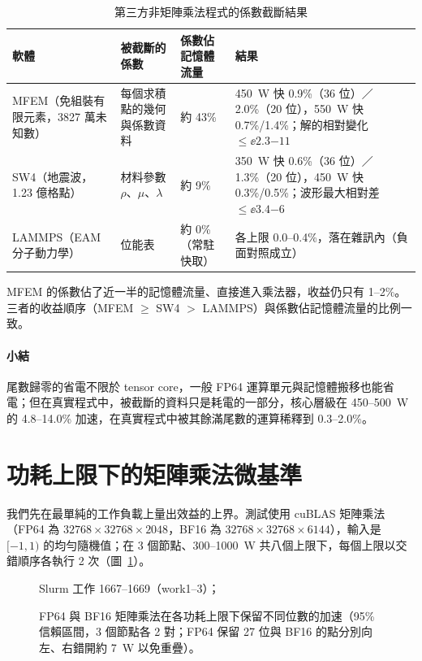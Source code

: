 \begin{table}[tbp]
\centering
\caption{第三方非矩陣乘法程式的係數截斷結果}\label{tab:apps}
\small
\begin{tabularx}{\textwidth}{@{}>{\raggedright\arraybackslash}p{3.0cm}>{\raggedright\arraybackslash}p{2.6cm}>{\centering\arraybackslash}p{1.9cm}L@{}}
\toprule
軟體 & 被截斷的係數 & 係數佔\newline 記憶體流量 & 結果 \\
\midrule
MFEM（免組裝有限元素，3827 萬未知數） & 每個求積點的幾何與係數資料 & 約 43\% & 450~W 快 0.9\%（36 位）／2.0\%（20 位），550~W 快 0.7\%/1.4\%；解的相對變化 $\le \ee{2.3}{-11}$ \\
SW4（地震波，1.23 億格點） & 材料參數 $\rho$、$\mu$、$\lambda$ & 約 9\% & 350~W 快 0.6\%（36 位）／1.3\%（20 位），450~W 快 0.3\%/0.5\%；波形最大相對差 $\le \ee{3.4}{-6}$ \\
LAMMPS（EAM 分子動力學） & 位能表 & 約 0\%（常駐快取） & 各上限 0.0–0.4\%，落在雜訊內（負面對照成立） \\
\bottomrule
\end{tabularx}
\end{table}

MFEM 的係數佔了近一半的記憶體流量、直接進入乘法器，收益仍只有 1–2\%。三者的收益順序（MFEM $\ge$ SW4 $>$ LAMMPS）與係數佔記憶體流量的比例一致。

\paragraph{小結}尾數歸零的省電不限於 tensor core，一般 FP64 運算單元與記憶體搬移也能省電；但在真實程式中，被截斷的資料只是耗電的一部分，核心層級在 450–500~W 的 4.8–14.0\% 加速，在真實程式中被其餘滿尾數的運算稀釋到 0.3–2.0\%。

\section{功耗上限下的矩陣乘法微基準}\label{sec:gemm}

我們先在最單純的工作負載上量出效益的上界。測試使用 cuBLAS 矩陣乘法（FP64 為 $32768\times32768\times2048$，BF16 為 $32768\times32768\times6144$），輸入是 $[-1,1)$ 的均勻隨機值；在 3 個節點、300–1000~W 共八個上限下，每個上限以交錯順序各執行 2 次（圖~\ref{fig:gemm}）。

\begin{figure}[tbp]
\centering
{}
\caption[矩陣乘法微基準在各功耗上限下的加速]{FP64 與 BF16 矩陣乘法在各功耗上限下保留不同位數的加速（95\% 信賴區間，3 個節點各 2 對；FP64 保留 27 位與 BF16 的點分別向左、右錯開約 7~W 以免重疊）。}\label{fig:gemm}
\begin{figsource}Slurm 工作 1667–1669（work1–3）；\end{figsource}
\end{figure}


